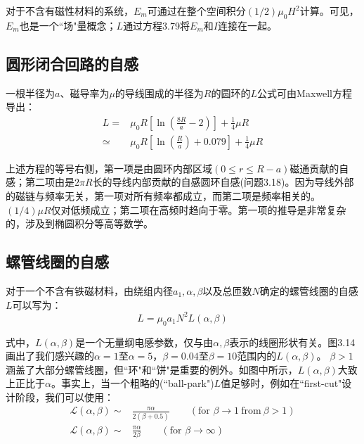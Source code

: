 对于不含有磁性材料的系统，$E_m$可通过在整个空间积分$(1/2)\mu_0 H^2$计算。可见，$E_m$也是一个``场"量概念；$L$通过方程3.79将$E_m$和$I$连接在一起。

\subsection{圆形闭合回路的自感}
一根半径为$a$、磁导率为$\mu$的导线围成的半径为$R$的圆环的$L$公式可由Maxwell方程导出：
\begin{subequations}
	\begin{align}
L=&\mu_0R\left[\ln(\frac{8R}{a}-2)\right]+\frac{1}{4}\mu R \\
\simeq & \mu_0R\left[\ln(\frac{R}{a})+0.079\right]+\frac{1}{4}\mu R%
	\end{align}
\end{subequations}

上述方程的等号右侧，第一项是由圆环内部区域$(0\le r \le R-a)$磁通贡献的自感；第二项由是$2\pi R$长的导线内部贡献的自感圆环自感(问题3.18)。因为导线外部的磁链与频率无关，第一项对所有频率都成立，而第二项是频率相关的。$(1/4)\mu R$仅对低频成立；第二项在高频时趋向于零。第一项的推导是非常复杂的，涉及到椭圆积分等高等数学。

\subsection{螺管线圈的自感}
对于一个不含有铁磁材料，由绕组内径$a_1,\alpha,\beta$以及总匝数$N$确定的螺管线圈的自感$L$可以写为：
\begin{equation}
L=\mu_0a_1N^2L(\alpha,\beta)%
\end{equation}

式中，$L(\alpha,\beta)$是一个无量纲电感参数，仅与由$\alpha,\beta$表示的线圈形状有关。图3.14画出了我们感兴趣的$\alpha=1$至$\alpha=5$，$\beta=0.04$至$\beta=10$范围内的$L(\alpha,\beta)$。
$\beta>1$涵盖了大部分螺管线圈，但``环"和``饼"是重要的例外。如图中所示，$L(\alpha,\beta)$大致上正比于$\alpha$。事实上，当一个粗略的(``ball-park")$L$值足够时，例如在``first-cut"设计阶段，我们可以使用：
\begin{subequations}
	\begin{align}
\mathcal{L}(\alpha,\beta)\sim&\frac{\pi\alpha}{2(\beta+0.5)} \qquad(\mbox{for } \beta\rightarrow 1\ \mbox{from}\ \beta>1)\\ 
\mathcal{L}(\alpha,\beta)\sim&\frac{\pi\alpha}{2\beta}\qquad (\mbox{for } \beta\rightarrow \infty)
	\end{align}
\end{subequations}


